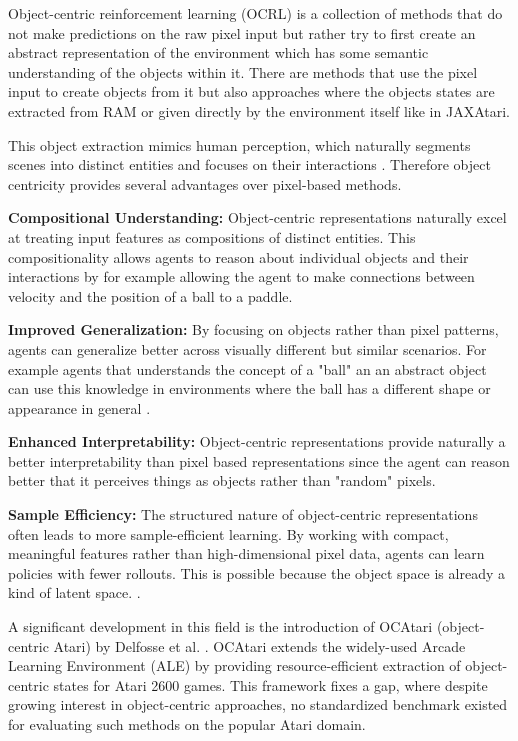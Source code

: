 \documentclass[
	english,
	ruledheaders=section,
	class=report,
	thesis={type=master},
	accentcolor=9c,
	custommargins=true,
	marginpar=false,
	parskip=half-,
	fontsize=11pt,
	pdfa=true,
]{tudapub}
\begin{document}
Object-centric reinforcement learning (OCRL) is a collection of methods that do
not make predictions on the raw pixel input but rather try to first create an
abstract representation of the environment which has some semantic
understanding of the objects within it. There are methods that use the pixel
input to create objects from it \cite{DBLP:conf/nips/LocatelloWUMHUD20} but also approaches
where the objects states are extracted from RAM \cite{DBLP:conf/rlc/DelfosseBGSK24} or
given directly by the environment itself like in JAXAtari.

This object extraction mimics human perception, which naturally segments scenes
into distinct entities and focuses on their interactions
\cite{spelke1990principles}. Therefore object centricity provides several
advantages over pixel-based methods.

\textbf{Compositional Understanding:} Object-centric representations naturally excel at treating input features as compositions of distinct entities.
This compositionality allows agents to reason about individual objects and their interactions by for example allowing the agent
to make connections between velocity and the position of a ball to a paddle.

\textbf{Improved Generalization:} By focusing on objects rather than pixel patterns, agents can generalize better across visually different but similar scenarios. For example agents that
understands the concept of a "ball" an an abstract object can use this knowledge in environments where the ball has a different shape or appearance in general \cite{DBLP:conf/iclr/ZambaldiRSBLBTR19}.

\textbf{Enhanced Interpretability:} Object-centric representations provide naturally a better interpretability than pixel based representations since the agent can reason better that it perceives things as objects rather than "random" pixels.

\textbf{Sample Efficiency:} The structured nature of object-centric representations often leads to more sample-efficient learning. By working with compact, meaningful features rather than high-dimensional
pixel data, agents can learn policies with fewer rollouts. This is possible because the object space is already a kind of latent space. \cite{DBLP:conf/nips/LocatelloWUMHUD20}.

A significant development in this field is the introduction of OCAtari
(object-centric Atari) by Delfosse et al. \cite{DBLP:conf/rlc/DelfosseBGSK24}. OCAtari
extends the widely-used Arcade Learning Environment (ALE) by providing
resource-efficient extraction of object-centric states for Atari 2600 games.
This framework fixes a gap, where despite growing interest in object-centric
approaches, no standardized benchmark existed for evaluating such methods on
the popular Atari domain.
\end{document}
